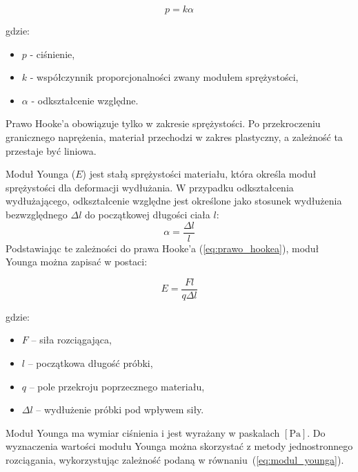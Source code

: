 \documentclass[a4paper,12pt]{article}
\begin{document}
\begin{equation} \label{eq:prawo_hookea}
    p = k\alpha
\end{equation}

gdzie:
\begin{itemize}
    \setlength{\itemsep}{0em}
    \item $p$ - ciśnienie,
    \item $k$ - współczynnik proporcjonalności zwany modułem sprężystości,
    \item $\alpha$ - odkształcenie względne.
\end{itemize}

Prawo Hooke’a obowiązuje tylko w zakresie sprężystości. Po przekroczeniu granicznego naprężenia, materiał przechodzi w zakres plastyczny, a zależność ta przestaje być liniowa.





Moduł Younga ($E$) jest stałą sprężystości materiału, która określa moduł sprężystości dla deformacji wydłużania. W przypadku odkształcenia wydłużającego, odkształcenie względne jest określone jako stosunek wydłużenia bezwzględnego $\Delta{l}$ do początkowej długości ciała $l$:
$$
    \alpha = \frac{\Delta l}{l}
$$
Podstawiając te zależności do prawa Hooke’a (\ref{eq:prawo_hookea}), moduł Younga można zapisać w postaci:

\begin{equation} \label{eq:modul_younga}
    E = \frac{Fl}{q \Delta l}
\end{equation}

gdzie:
\begin{itemize}
    \setlength{\itemsep}{0em}
    \item $F$ – siła rozciągająca,
    \item $l$ – początkowa długość próbki,
    \item $q$ – pole przekroju poprzecznego materiału,
    \item $\Delta l$ – wydłużenie próbki pod wpływem siły.
\end{itemize}
Moduł Younga ma wymiar ciśnienia i jest wyrażany w paskalach $[\text{Pa}]$.
Do wyznaczenia wartości modułu Younga można skorzystać z metody jednostronnego rozciągania, wykorzystując zależność podaną w równaniu~(\ref{eq:modul_younga}).
\end{document}
